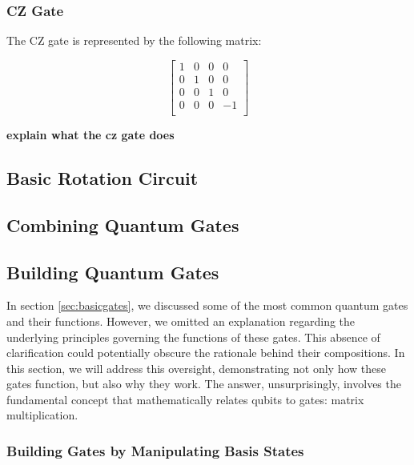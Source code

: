 \documentclass{article}
\begin{document}
\subsubsection{CZ Gate}
\label{sec:czgate}

The CZ gate is represented by the following matrix:

\[
	\begin{bmatrix}
		1 & 0 & 0 & 0 \\
		0 & 1 & 0 & 0 \\
		0 & 0 & 1 & 0 \\
		0 & 0 & 0 & -1 \\
	\end{bmatrix}
\]

\textbf{explain what the cz gate does}



\subsection{Basic Rotation Circuit}
\label{sec:basicrotationcircuit}
\subsection{Combining Quantum Gates}
\label{sec:combininggates}
\subsection{Building Quantum Gates}
\label{sec:buildinggates}
In section \ref{sec:basicgates}, we discussed some of the most common quantum gates and their functions.
However, we omitted an explanation regarding the underlying principles governing the functions of these gates.
This absence of clarification could potentially obscure the rationale behind their compositions.
In this section, we will address this oversight, demonstrating not only how these gates function, but also why they work.
The answer, unsurprisingly, involves the fundamental concept that mathematically relates qubits to gates: matrix multiplication.



\subsubsection{Building Gates by Manipulating Basis States}
\label{sec:manipulatingbasisstates}
\end{document}
